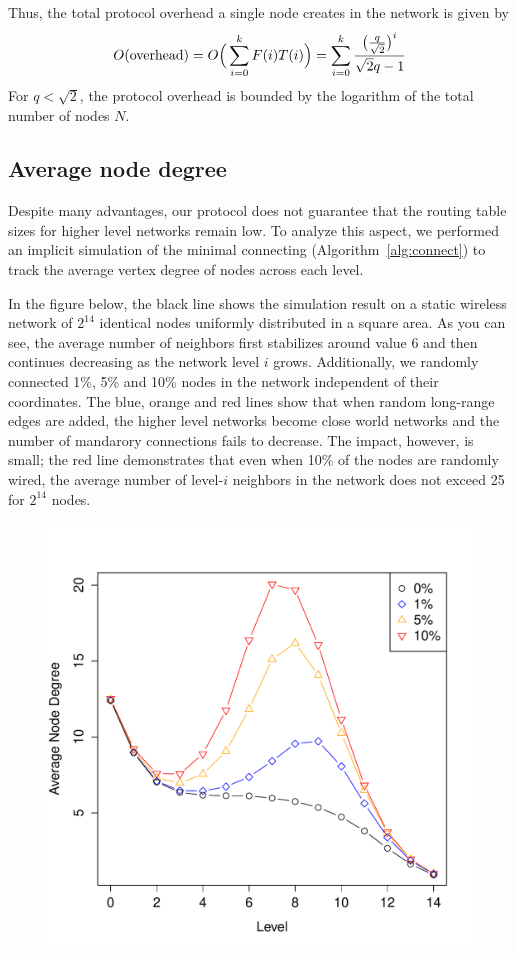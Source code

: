 \documentclass[conference]{IEEEtran}
\theoremstyle{definition}
\begin{document}
Thus, the total protocol overhead a single node creates in the network is given by
%
\begin{equation*}
    O({\rm overhead}) = O\Big( \sum_{i = 0}^{k} F(i)T(i) \Big) = \sum_{i = 0}^{k} \frac{ \big( \frac{q}{\sqrt{2}} \big)^i }{ \sqrt{2}q - 1 }
\end{equation*}
%
For $q < \sqrt{2}$, the protocol overhead is bounded by the logarithm of the total number of nodes $N$.


\subsection{Average node degree}
\label{sec:analysis:nodedegree}

Despite many advantages, our protocol does not guarantee that the routing table sizes for higher level networks remain low. To analyze this aspect, we performed an implicit simulation of the minimal connecting (Algorithm~\ref{alg:connect}) to track the average vertex degree of nodes across each level.

In the figure below, the black line shows the simulation result on a static wireless network of $2^{14}$ identical nodes uniformly distributed in a square area. As you can see, the average number of neighbors first stabilizes around value 6 and then continues decreasing as the network level $i$ grows. Additionally, we randomly connected 1\%, 5\% and 10\% nodes in the network independent of their coordinates. The blue, orange and red lines show that when random long-range edges are added, the higher level networks become close world networks and the number of mandarory connections fails to decrease. The impact, however, is small; the red line demonstrates that even when 10\% of the nodes are randomly wired, the average number of level-$i$ neighbors in the network does not exceed 25 for $2^{14}$ nodes.

\begin{figure}[H]
    \includegraphics[width=0.95\linewidth]{degrees}

    \label{fig:degrees}
\end{figure}
\end{document}
